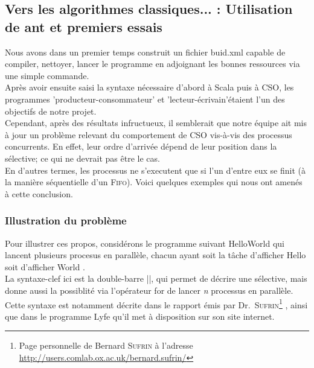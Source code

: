 \documentclass[a4paper,11pt,french]{report}
\begin{document}
\subsection[Vers les algorithmes classiques...]{Vers les algorithmes classiques... : Utilisation de \textsf{ant} et premiers essais}

Nous avons dans un premier temps construit un fichier \textsf{buid.xml} capable de compiler, nettoyer, lancer le programme en adjoignant les bonnes ressources via une simple commande.\\ Après avoir ensuite saisi la syntaxe nécessaire d'abord à Scala puis à CSO, les programmes 'producteur-consommateur' et 'lecteur-écrivain'étaient l'un des objectifs de notre projet.\\

Cependant, après des résultats infructueux, il semblerait que notre équipe ait mis à jour un problème relevant du comportement de CSO vis-à-vis des processus concurrents. En effet, leur ordre d'arrivée dépend de leur position dans la sélective; ce qui ne devrait pas être le cas.\\ 

En d'autres termes, les processus ne s'executent que si l'un d'entre eux se finit (à la manière séquentielle d'un \textsc{Fifo}). Voici quelques exemples qui nous ont amenés à cette conclusion.

\subsubsection{Illustration du problème}

Pour illustrer ces propos, considérons le programme suivant \textsf{HelloWorld} qui lancent plusieurs procesus en parallèle, chacun ayant soit la tâche d'afficher \og Hello \fg soit d'afficher \og World \fg.\\
La syntaxe-clef ici est la double-barre ||, qui permet de décrire une sélective, mais donne aussi la possiblité via l'opérateur \textsf{for} de lancer \textit{n} processus en parallèle.\\
Cette syntaxe est notamment décrite dans le rapport émis par Dr.\ \textsc{Sufrin}\footnote{Page personnelle de Bernard \textsc{Sufrin} à l'adresse \url{http://users.comlab.ox.ac.uk/bernard.sufrin/}} \cite{cpa2008-cso}, ainsi que dans le programme Lyfe qu'il met à disposition sur son site internet.
\medskip
\end{document}

